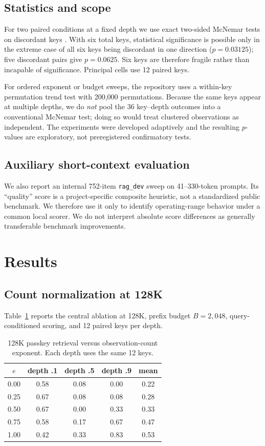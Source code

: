 \documentclass[10pt,twocolumn]{article}
\begin{document}
\subsection{Statistics and scope}
For two paired conditions at a fixed depth we use exact two-sided McNemar tests on discordant keys \citep{mcnemar1947}. With six total keys, statistical significance is possible only in the extreme case of all six keys being discordant in one direction ($p=0.03125$); five discordant pairs give $p=0.0625$. Six keys are therefore fragile rather than incapable of significance. Principal cells use 12 paired keys.

For ordered exponent or budget sweeps, the repository uses a within-key permutation trend test with 200,000 permutations. Because the same keys appear at multiple depths, we do \emph{not} pool the 36 key--depth outcomes into a conventional McNemar test; doing so would treat clustered observations as independent. The experiments were developed adaptively and the resulting $p$-values are exploratory, not preregistered confirmatory tests.

\subsection{Auxiliary short-context evaluation}
We also report an internal 752-item \texttt{rag\_dev} sweep on 41--330-token prompts. Its ``quality'' score is a project-specific composite heuristic, not a standardized public benchmark. We therefore use it only to identify operating-range behavior under a common local scorer. We do not interpret absolute score differences as generally transferable benchmark improvements.

\section{Results}
\subsection{Count normalization at 128K}
Table~\ref{tab:exp} reports the central ablation at 128K, prefix budget $B=2,048$, query-conditioned scoring, and 12 paired keys per depth.

\begin{table}[t]
\centering
\caption{128K passkey retrieval versus observation-count exponent. Each depth uses the same 12 keys.}
\label{tab:exp}
\small
\begin{tabular}{ccccc}
\toprule
$e$ & depth .1 & depth .5 & depth .9 & mean \\
\midrule
0.00 & 0.58 & 0.08 & 0.00 & 0.22 \\
0.25 & 0.67 & 0.08 & 0.08 & 0.28 \\
0.50 & 0.67 & 0.00 & 0.33 & 0.33 \\
0.75 & 0.58 & 0.17 & 0.67 & 0.47 \\
1.00 & 0.42 & 0.33 & 0.83 & 0.53 \\
\bottomrule
\end{tabular}
\end{table}
\end{document}

